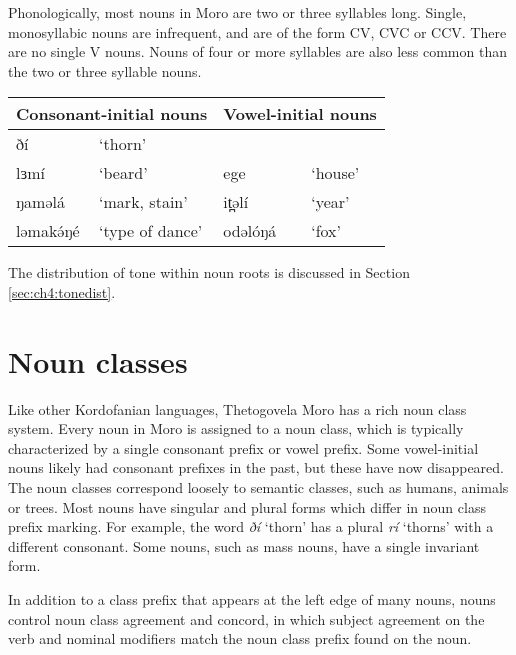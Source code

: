 Phonologically, most nouns in Moro are two or three syllables long. Single, monosyllabic nouns are infrequent, and are of the form CV, CVC or CCV. There are no single V nouns. Nouns of four or more syllables are also less common than the two or three syllable nouns.

\ea 	\begin{tabular}[t]{llll}
  \multicolumn{2}{l}{Consonant-initial nouns} &   \multicolumn{2}{l}{Vowel-initial nouns} \\
\midrule
ðí	&	‘thorn’			&		&	 \\
lɜmí	&	‘beard’	&	ege		&	‘house’ \\
ŋaməlá	&	‘mark, stain’	&		it̪əlí	&	‘year’\\
ləmakə́ŋé	&	‘type of dance’	&	odəlóŋá	& ‘fox’ \\
			 	\end{tabular} \z
The distribution of tone within noun roots is discussed in Section \ref{sec:ch4:tonedist}.

\section{Noun classes}\label{sec:ch6:nclasses}

Like other Kordofanian languages, Thetogovela Moro has a rich noun class system. Every noun in Moro is assigned to a noun class, which is typically characterized by a single consonant prefix or vowel prefix. Some vowel-initial nouns likely had consonant prefixes in the past, but these have now disappeared. The noun classes correspond loosely to semantic classes, such as humans, animals or trees. Most nouns have singular and plural forms which differ in noun class prefix marking. For example, the word \textit{ðí} ‘thorn’ has a plural \textit{rí} ‘thorns’ with a different consonant. Some nouns, such as mass nouns, have a single invariant form.

In addition to a class prefix that appears at the left edge of many nouns, nouns control noun class agreement and concord, in which subject agreement on the verb and nominal modifiers match the noun class prefix found on the noun.

